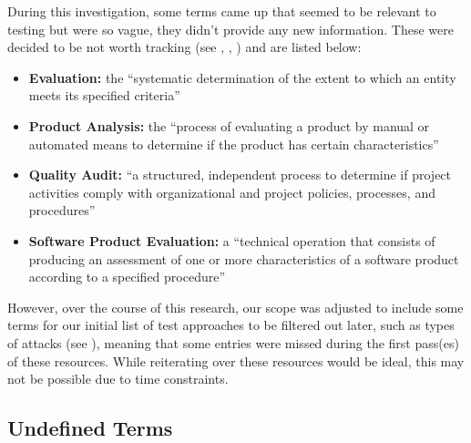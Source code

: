 During this investigation, some terms came up that seemed to be relevant to
testing but were so vague, they didn't provide any new information. These were
decided to be not worth tracking (see , ,
) and are listed below:

\begin{itemize}
      \item \textbf{Evaluation:} the ``systematic determination of the extent
            to which an entity meets its specified criteria''
            \citep[p.~167]{IEEE2017}
      \item \textbf{Product Analysis:} the ``process of evaluating a product by
            manual or automated means to determine if the product has certain
            characteristics'' \citep[p.~343]{IEEE2017}
      \item \textbf{Quality Audit:} ``a structured, independent process to
            determine if project activities comply with organizational and
            project policies, processes, and procedures'' \citep[p.~361]{IEEE2017}
      \item \textbf{Software Product Evaluation:} a ``technical operation that
            consists of producing an assessment of one or more characteristics
            of a software product according to a specified procedure''
            \citep[p.~424]{IEEE2017}
\end{itemize}

However, over the course of this research, our scope was adjusted to include
some terms for our initial list of test approaches to be filtered out later,
such as types of attacks (see ), meaning that some entries
were missed during the first pass(es) of these resources. While reiterating
over these resources would be ideal, this may not be possible due to time
constraints.

\subsection{Undefined Terms}
\label{undef-terms}


\newcount\TotalBefore
\newcount\TotalAfter
\newcount\UndefBefore
\newcount\UndefAfter



